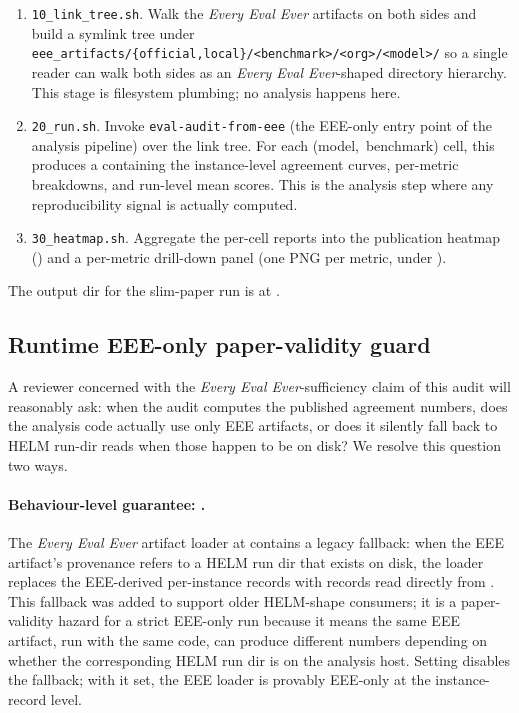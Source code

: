 \documentclass[11pt]{article}
\newcommand{\eee}{\textit{Every Eval Ever}\xspace}
\begin{document}
\begin{enumerate}
  \item \texttt{10\_link\_tree.sh}.
        Walk the \eee{} artifacts on both sides and build a symlink
        tree under
        \texttt{eee\_artifacts/\{official,local\}/<benchmark>/<org>/<model>/}
        so a single reader can walk both sides as an \eee{}-shaped
        directory hierarchy.
        This stage is filesystem plumbing; no analysis happens here.
  \item \texttt{20\_run.sh}.
        Invoke \texttt{eval-audit-from-eee} (the EEE-only entry point
        of the analysis pipeline) over the link tree.
        For each \mbox{(model, benchmark)} cell, this produces a
         containing the
        instance-level agreement curves, per-metric breakdowns, and
        run-level mean scores.
        This is the analysis step where any reproducibility signal is
        actually computed.
  \item \texttt{30\_heatmap.sh}.
        Aggregate the per-cell reports into the publication heatmap
        () and a per-metric
        drill-down panel (one PNG per metric, under
        ).
\end{enumerate}

The output dir for the slim-paper run is at
  .

\subsection{Runtime EEE-only paper-validity guard}
\label{sec:tr-paper-validity-guard}

A reviewer concerned with the \eee{}-sufficiency claim of this audit
  will reasonably ask: when the audit computes the published agreement
  numbers, does the analysis code actually use only EEE artifacts, or
  does it silently fall back to HELM run-dir reads when those happen
  to be on disk?
We resolve this question two ways.

\paragraph{Behaviour-level guarantee: .}
The \eee{} artifact loader at
   contains a legacy
  fallback: when the EEE artifact's provenance refers to a HELM run
  dir that exists on disk, the loader replaces the EEE-derived
  per-instance records with records read directly from
  .
This fallback was added to support older HELM-shape consumers; it is
  a paper-validity hazard for a strict EEE-only run because it means
  the same EEE artifact, run with the same code, can produce
  different numbers depending on whether the corresponding HELM run
  dir is on the analysis host.
Setting  disables the fallback;
  with it set, the EEE loader is provably EEE-only at the
  instance-record level.
\end{document}
